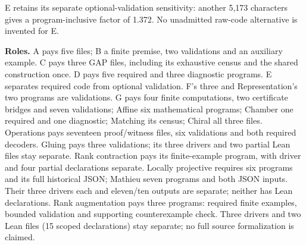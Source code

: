 \documentclass[11pt,a4paper]{article}
\begin{document}
E retains its separate optional-validation sensitivity: another 5,173 characters gives a program-inclusive factor of 1.372. No unadmitted raw-code alternative is invented for E.

\textbf{Roles.} A pays five files; B a finite premise, two validations and an auxiliary example. C pays three GAP files, including its exhaustive census and the shared construction once. D pays five required and three diagnostic programs. E separates required code from optional validation. F's three and Representation's two programs are validations. G pays four finite computations, two certificate bridges and seven validations; Affine six mathematical programs; Chamber one required and one diagnostic; Matching its census; Chiral all three files. Operations pays seventeen proof/witness files, six validations and both required decoders. Gluing pays three validations; its three drivers and two partial Lean files stay separate. Rank contraction pays its finite-example program, with driver and four partial declarations separate. Locally projective requires six programs and its full historical JSON; Mathieu seven programs and both JSON inputs. Their three drivers each and eleven/ten outputs are separate; neither has Lean declarations. Rank augmentation pays three programs: required finite examples, bounded validation and supporting counterexample check. Three drivers and two Lean files (15 scoped declarations) stay separate; no full source formalization is claimed.
\end{document}
